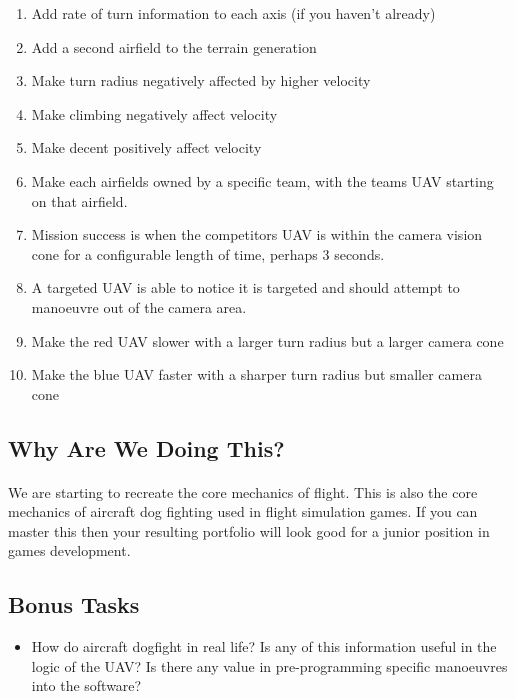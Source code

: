\documentclass[11pt]{book}
\begin{document}
\begin{enumerate}
\item Add rate of turn information to each axis (if you haven't already)
\item Add a second airfield to the terrain generation
\item Make turn radius negatively affected by higher velocity
\item Make climbing negatively affect velocity
\item Make decent positively affect velocity
\item Make each airfields owned by a specific team, with the teams UAV starting on that airfield.
\item Mission success is when the competitors UAV is within the camera vision cone for a configurable length of time, perhaps 3 seconds.
\item A targeted UAV is able to notice it is targeted and should attempt to manoeuvre out of the camera area.
\item Make the red UAV slower with a larger turn radius but a larger camera cone
\item Make the blue UAV faster with a sharper turn radius but smaller camera cone
\end{enumerate}

\subsection{Why Are We Doing This?}

\paragraph{} We are starting to recreate the core mechanics of flight. This is also the core mechanics of aircraft dog fighting used in flight simulation games. If you can master this then your resulting portfolio will look good for a junior position in games development.

\paragraph{}
\subsection{Bonus Tasks}
\begin{itemize}
\item How do aircraft dogfight in real life? Is any of this information useful in the logic of the UAV? Is there any value in pre-programming specific manoeuvres into the software?
\end{itemize}
\end{document}
